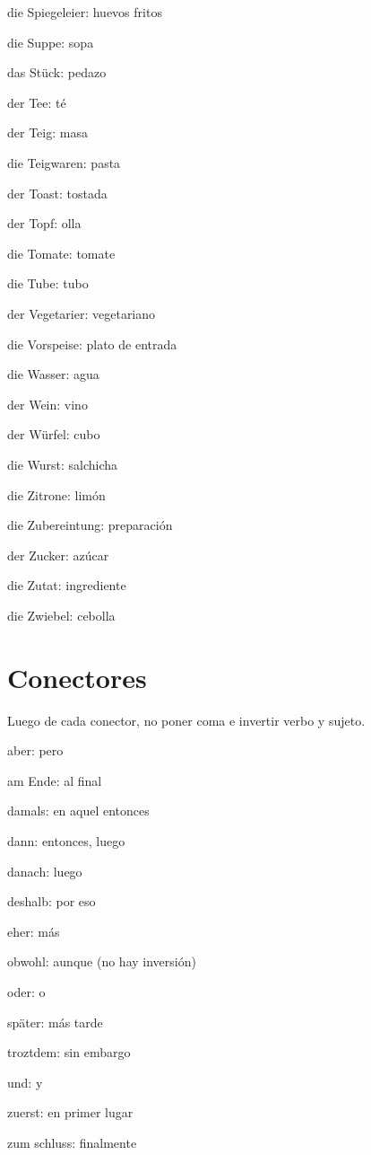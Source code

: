 \begin{multicols}{2}
\begin{myitemize}
\item die Spiegeleier: huevos fritos
\item die Suppe: sopa
\item das Stück: pedazo
\item der Tee: té
\item der Teig: masa
\item die Teigwaren: pasta
\item der Toast: tostada
\item der Topf: olla
\item die Tomate: tomate
\item die Tube: tubo
\item der Vegetarier: vegetariano
\item die Vorspeise: plato de entrada
\item die Wasser: agua
\item der Wein: vino
\item der Würfel: cubo
\item die Wurst: salchicha
\item die Zitrone: limón
\item die Zubereintung: preparación
\item der Zucker: azúcar
\item die Zutat: ingrediente
\item die Zwiebel: cebolla
\end{myitemize}
\end{multicols}

\section{Conectores}
Luego de cada conector, no poner coma e invertir verbo y sujeto.
\begin{multicols}{3}
\begin{myitemize}
\item aber: pero
\item am Ende: al final
\item damals: en aquel entonces
\item dann: entonces, luego
\item danach: luego
\item deshalb: por eso
\item eher: más
\item obwohl: aunque (no hay inversión)
\item oder: o
\item später: más tarde
\item troztdem: sin embargo
\item und: y
\item zuerst: en primer lugar
\item zum schluss: finalmente
\end{myitemize}
\end{multicols}

